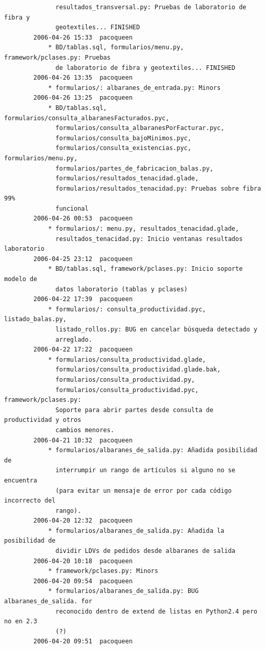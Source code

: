 \documentclass[a4paper]{article}
\begin{document}
\begin{verbatim}
              resultados_transversal.py: Pruebas de laboratorio de fibra y
              geotextiles... FINISHED
        2006-04-26 15:33  pacoqueen
            * BD/tablas.sql, formularios/menu.py, framework/pclases.py: Pruebas
              de laboratorio de fibra y geotextiles... FINISHED
        2006-04-26 13:35  pacoqueen
            * formularios/: albaranes_de_entrada.py: Minors
        2006-04-26 13:25  pacoqueen
            * BD/tablas.sql, formularios/consulta_albaranesFacturados.pyc,
              formularios/consulta_albaranesPorFacturar.pyc,
              formularios/consulta_bajoMinimos.pyc,
              formularios/consulta_existencias.pyc, formularios/menu.py,
              formularios/partes_de_fabricacion_balas.py,
              formularios/resultados_tenacidad.glade,
              formularios/resultados_tenacidad.py: Pruebas sobre fibra 99%
              funcional
        2006-04-26 00:53  pacoqueen
            * formularios/: menu.py, resultados_tenacidad.glade,
              resultados_tenacidad.py: Inicio ventanas resultados laboratorio
        2006-04-25 23:12  pacoqueen
            * BD/tablas.sql, framework/pclases.py: Inicio soporte modelo de
              datos laboratorio (tablas y pclases)
        2006-04-22 17:39  pacoqueen
            * formularios/: consulta_productividad.pyc, listado_balas.py,
              listado_rollos.py: BUG en cancelar búsqueda detectado y
              arreglado.
        2006-04-22 17:22  pacoqueen
            * formularios/consulta_productividad.glade,
              formularios/consulta_productividad.glade.bak,
              formularios/consulta_productividad.py,
              formularios/consulta_productividad.pyc, framework/pclases.py:
              Soporte para abrir partes desde consulta de productividad y otros
              cambios menores.
        2006-04-21 10:32  pacoqueen
            * formularios/albaranes_de_salida.py: Añadida posibilidad de
              interrumpir un rango de artículos si alguno no se encuentra
              (para evitar un mensaje de error por cada código incorrecto del
              rango).
        2006-04-20 12:32  pacoqueen
            * formularios/albaranes_de_salida.py: Añadida la posibilidad de
              dividir LDVs de pedidos desde albaranes de salida
        2006-04-20 10:18  pacoqueen
            * framework/pclases.py: Minors
        2006-04-20 09:54  pacoqueen
            * formularios/albaranes_de_salida.py: BUG albaranes_de_salida. for
              reconocido dentro de extend de listas en Python2.4 pero no en 2.3
              (?)
        2006-04-20 09:51  pacoqueen

\end{verbatim}
\end{document}
